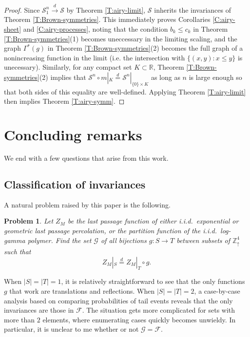 \documentclass[aop, preprint]{imsart}
\theoremstyle{plain}
\newtheorem{problem}[theorem]{Problem}
\theoremstyle{definition}
\theoremstyle{plain}
\newcommand{\sset}{\subset}
\newcommand{\Ga}{\Gamma}
\newcommand{\Zd}{\mathds{Z}^4_\uparrow}
\newcommand{\scrG}{\mathcal{G}}
\newcommand{\scrS}{\mathcal{S}}
\newcommand{\scrF}{\mathcal{F}}
\newcommand{\R}{\mathds{R}}
\newcommand{\eqd}{\stackrel{d}{=}}
\newcommand{\cvgd}{\stackrel{d}{\to}}
\newcommand{\X}{\times}
\begin{document}
\begin{proof}
	Since $\scrS^n_1 \cvgd \scrS$ by Theorem \ref{T:airy-limit}, $\scrS$ inherits the invariances of Theorem \ref{T:Brown-symmetries}. This immediately proves Corollaries \ref{C:airy-sheet} and \ref{C:airy-processes}, noting that the condition $b_k \le c_k$ in Theorem \ref{T:Brown-symmetries}(1) becomes uneccessary in the limiting scaling, and the graph $\Ga^*(g)$ in Theorem \ref{T:Brown-symmetries}(2) becomes the full graph of a nonincreasing function in the limit (i.e. the intersection with $\{(x, y) : x \le y\}$ is unecessary). Similarly, for any compact set $K \sset \R$, Theorem \ref{T:Brown-symmetries}(2) implies that $\scrS^n \circ m|_K \eqd \scrS^n|_{\{0\} \X K}$ as long as $n$ is large enough so that both sides of this equality are well-defined. Applying Theorem \ref{T:airy-limit} then implies Theorem \ref{T:airy-symm}. 
\end{proof}

\section{Concluding remarks}
\label{S:conclude}

We end with a few questions that arise from this work.

\subsection*{Classification of invariances}

A natural problem raised by this paper is the following.

\begin{problem}
	Let $Z_M$ be the last passage function of either i.i.d.\ exponential or geometric last passage percolation, or the partition function of the i.i.d.\ log-gamma polymer. Find the set $\scrG$ of all bijections $g:S \to T$ between subsets of $\Zd$ such that
	$$
	Z_M|_{S} \eqd Z_M|_{T} \circ g.
	$$
\end{problem}

When $|S| = |T| = 1$, it is relatively straightforward to see that the only functions $g$ that work are translations and reflections.  When $|S| = |T| = 2$, a case-by-case analysis based on comparing probabilities of tail events reveals that the only invariances are those in $\scrF$. The situation gets more complicated for sets with more than $2$ elements, where enumerating cases quickly becomes unwieldy. In particular, it is unclear to me whether or not $\scrG = \scrF$.
\end{document}
